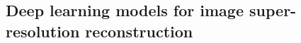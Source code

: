 \subsection{Deep learning models for image super-resolution reconstruction}
\label{proposed_approach}
